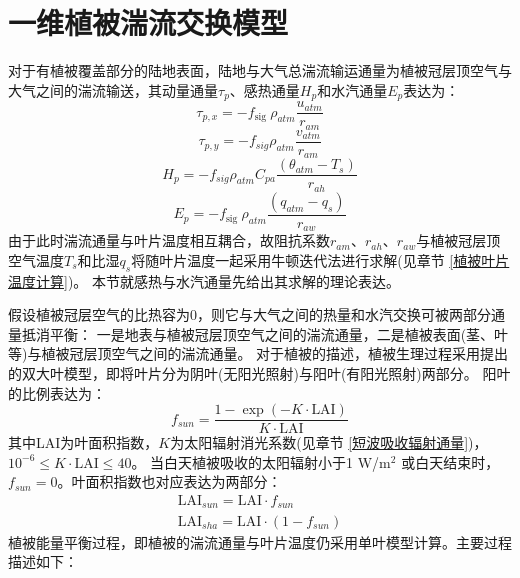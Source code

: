 \section{一维植被湍流交换模型}\label{一维植被湍流交换模型}
对于有植被覆盖部分的陆地表面，陆地与大气总湍流输运通量为植被冠层顶空气与大气之间的湍流输送，其动量通量$\tau_p$、感热通量$H_p$和水汽通量$E_p$表达为：
\begin{equation}
\tau_{p, x}=-f_{\text {sig }} \rho_{atm} \frac{u_{atm}}{r_{a m}}
\end{equation}
\begin{equation}
\tau_{p, y}=-f_{sig} \rho_{atm} \frac{v_{atm}}{r_{a m}}
\end{equation}
\begin{equation}
H_{p}=-f_{sig} \rho_{atm} C_{p a} \frac{\left(\theta_{atm}-T_{s}\right)}{r_{a h}}
\end{equation}
\begin{equation}
E_{p}=-f_{\text {sig }} \rho_{atm} \frac{\left(q_{atm}-q_{s}\right)}{r_{a w}}
\end{equation}
由于此时湍流通量与叶片温度相互耦合，故阻抗系数$r_{am}$、$r_{ah}$、$r_{aw}$与植被冠层顶空气温度$T_s$和比湿$q_s$将随叶片温度一起采用牛顿迭代法进行求解(见章节 \ref{植被叶片温度计算})。
本节就感热与水汽通量先给出其求解的理论表达。


假设植被冠层空气的比热容为0，则它与大气之间的热量和水汽交换可被两部分通量抵消平衡：
一是地表与植被冠层顶空气之间的湍流通量，二是植被表面(茎、叶等)与植被冠层顶空气之间的湍流通量。
对于植被的描述，植被生理过程采用\citet{dai2004two}提出的双大叶模型，即将叶片分为阴叶(无阳光照射)与阳叶(有阳光照射)两部分。
阳叶的比例表达为：
\begin{equation}
f_{sun}=\frac{1-\exp (-K \cdot \text {LAI})}{K \cdot \text {LAI}}
\end{equation}
其中LAI为叶面积指数，$K$为太阳辐射消光系数(见章节 \ref{短波吸收辐射通量})，${10}^{-6}\le K \cdot \text {LAI}\le40$。
当白天植被吸收的太阳辐射小于1 W/m$^2$ 或白天结束时，$f_{sun}=0$。叶面积指数也对应表达为两部分：
\begin{equation}
\begin{array}{c} \text {LAI}_{sun}= \text {LAI} \cdot f_{sun} \\ \text {LAI}_{sha}=\text {LAI} \cdot \left(1-f_{sun}\right)\end{array}
\end{equation}
植被能量平衡过程，即植被的湍流通量与叶片温度仍采用单叶模型计算。主要过程描述如下：


